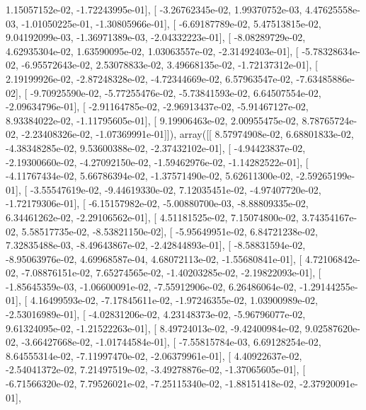 \documentclass{article}
\begin{document}
          1.15057152e-02,  -1.72243995e-01],
       [ -3.26762345e-02,   1.99370752e-03,   4.47625558e-03,
         -1.01050225e-01,  -1.30805966e-01],
       [ -6.69187789e-02,   5.47513815e-02,   9.04192099e-03,
         -1.36971389e-03,  -2.04332223e-01],
       [ -8.08289729e-02,   4.62935304e-02,   1.63590095e-02,
          1.03063557e-02,  -2.31492403e-01],
       [ -5.78328634e-02,  -6.95572643e-02,   2.53078833e-02,
          3.49668135e-02,  -1.72137312e-01],
       [  2.19199926e-02,  -2.87248328e-02,  -4.72344669e-02,
          6.57963547e-02,  -7.63485886e-02],
       [ -9.70925590e-02,  -5.77255476e-02,  -5.73841593e-02,
          6.64507554e-02,  -2.09634796e-01],
       [ -2.91164785e-02,  -2.96913437e-02,  -5.91467127e-02,
          8.93384022e-02,  -1.11795605e-01],
       [  9.19906463e-02,   2.00955475e-02,   8.78765724e-02,
         -2.23408326e-02,  -1.07369991e-01]]), array([[  8.57974908e-02,   6.68801833e-02,  -4.38348285e-02,
          9.53600388e-02,  -2.37432102e-01],
       [ -4.94423837e-02,  -2.19300660e-02,  -4.27092150e-02,
         -1.59462976e-02,  -1.14282522e-01],
       [ -4.11767434e-02,   5.66786394e-02,  -1.37571490e-02,
          5.62611300e-02,  -2.59265199e-01],
       [ -3.55547619e-02,  -9.44619330e-02,   7.12035451e-02,
         -4.97407720e-02,  -1.72179306e-01],
       [ -6.15157982e-02,  -5.00880700e-03,  -8.88809335e-02,
          6.34461262e-02,  -2.29106562e-01],
       [  4.51181525e-02,   7.15074800e-02,   3.74354167e-02,
          5.58517735e-02,  -8.53821150e-02],
       [ -5.95649951e-02,   6.84721238e-02,   7.32835488e-03,
         -8.49643867e-02,  -2.42844893e-01],
       [ -8.58831594e-02,  -8.95063976e-02,   4.69968587e-04,
          4.68072113e-02,  -1.55680841e-01],
       [  4.72106842e-02,  -7.08876151e-02,   7.65274565e-02,
         -1.40203285e-02,  -2.19822093e-01],
       [ -1.85645359e-03,  -1.06600091e-02,  -7.55912906e-02,
          6.26486064e-02,  -1.29144255e-01],
       [  4.16499593e-02,  -7.17845611e-02,  -1.97246355e-02,
          1.03900989e-02,  -2.53016989e-01],
       [ -4.02831206e-02,   4.23148373e-02,  -5.96796077e-02,
          9.61324095e-02,  -1.21522263e-01],
       [  8.49724013e-02,  -9.42400984e-02,   9.02587620e-02,
         -3.66427668e-02,  -1.01744584e-01],
       [ -7.55815784e-03,   6.69128254e-02,   8.64555314e-02,
         -7.11997470e-02,  -2.06379961e-01],
       [  4.40922637e-02,  -2.54041372e-02,   7.21497519e-02,
         -3.49278876e-02,  -1.37065605e-01],
       [ -6.71566320e-02,   7.79526021e-02,  -7.25115340e-02,
         -1.88151418e-02,  -2.37920091e-01],
\end{document}
